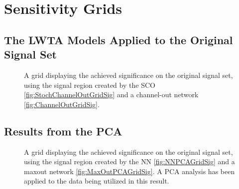 \section{Sensitivity Grids}\label{sec: Sensitivity}
\subsection{The \ac{LWTA} Models Applied to the Original Signal Set}\label{appendix:Ensembles}
\begin{figure}[H]
    \caption{A grid displaying the achieved significance on the original signal set, using the signal region 
    created by the \ac{SCO} \ref{fig:StochChannelOutGridSig} and a channel-out network \ref{fig:ChannelOutGridSig}.}
    \label{fig:SCOCO}
\end{figure}

\subsection{Results from the \ac{PCA}}\label{appendix:PCA}
\begin{figure}[H]
    \caption{A grid displaying the achieved significance on the original signal set, using the signal region 
    created by the \ac{NN} \ref{fig:NNPCAGridSig} and a maxout network \ref{fig:MaxOutPCAGridSig}. A \ac{PCA} 
    analysis has been applied to the data being utilized in this result.}
\end{figure}

